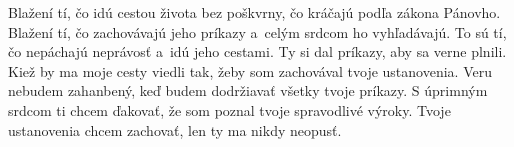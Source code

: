 Blažení tí, čo idú cestou života bez poškvrny,
čo kráčajú podľa zákona Pánovho.
\versseparator
Blažení tí, čo zachovávajú jeho príkazy
a~celým srdcom ho vyhľadávajú.
\versseparator
To sú tí, čo nepáchajú neprávosť
a~idú jeho cestami.
\versseparator
Ty si dal príkazy,
aby sa verne plnili.
\versseparator
Kiež by ma moje cesty viedli tak,
žeby som zachovával tvoje ustanovenia.
\versseparator
Veru nebudem zahanbený,
keď budem dodržiavať všetky tvoje príkazy.
\versseparator
S úprimným srdcom ti chcem ďakovať,
že som poznal tvoje spravodlivé výroky.
\versseparator
Tvoje ustanovenia chcem zachovať,
len ty ma nikdy neopusť.